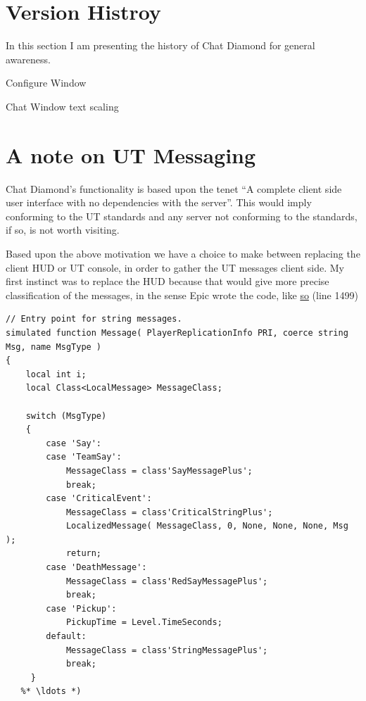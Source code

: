 \documentclass{article}
\theoremstyle{definition}
\begin{document}
\section{Version Histroy}
In this section I am presenting the history of Chat Diamond for general awareness.
\begin{changelog}[author=The\_Cowboy, sectioncmd=\section*]
\begin{version}[v=0.5, date=2023-xx-xx]
  \added
    \item Configure Window
  \fixed
    \item Chat Window text scaling
\end{version}
\end{changelog}

\section{A note on UT Messaging}
Chat Diamond's functionality is based upon the tenet ``A complete client side user interface with no dependencies with the server''.  This would imply conforming to the UT standards and any server not conforming to the standards, if so, is not worth visiting.

Based upon the above motivation we have a choice to make between replacing the client HUD or UT console, in order to gather the UT messages client side.  My first instinct was to replace the HUD because that would give more precise classification of the messages, in the sense Epic wrote the code, like \href{http://uncodex.ut-files.com/UT/v436/Source_botpack/challengehud.html}{so} (line 1499)

\begin{lstlisting}[frame=single]
// Entry point for string messages.
simulated function Message( PlayerReplicationInfo PRI, coerce string Msg, name MsgType )
{
    local int i;
    local Class<LocalMessage> MessageClass;

    switch (MsgType)
    {
        case 'Say':
        case 'TeamSay':
            MessageClass = class'SayMessagePlus';
            break;
        case 'CriticalEvent':
            MessageClass = class'CriticalStringPlus';
            LocalizedMessage( MessageClass, 0, None, None, None, Msg );
            return;
        case 'DeathMessage':
            MessageClass = class'RedSayMessagePlus';
            break;
        case 'Pickup':
            PickupTime = Level.TimeSeconds;
        default:
            MessageClass = class'StringMessagePlus';
            break;
     }
   %* \ldots *)           
\end{lstlisting}
\end{document}
